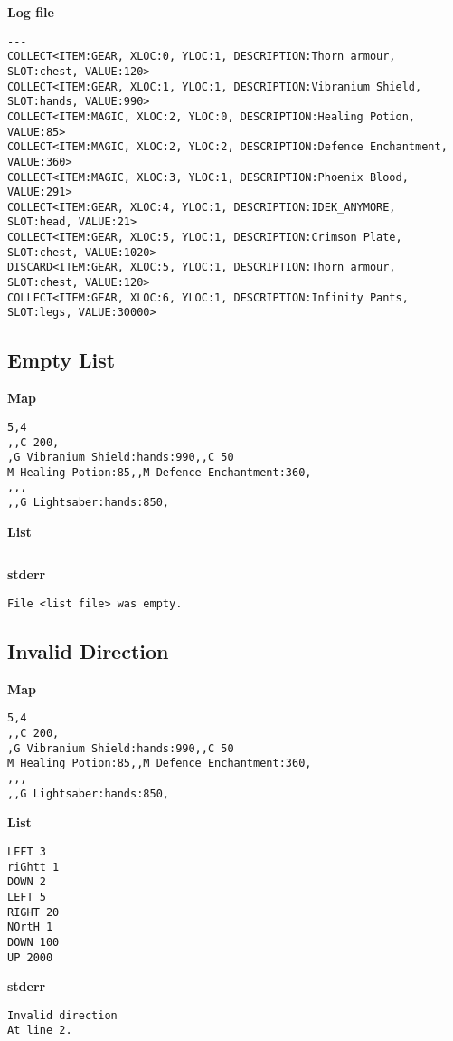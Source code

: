 \documentclass{article}
\begin{document}
\textbf{Log file}
\begin{lstlisting}
---
COLLECT<ITEM:GEAR, XLOC:0, YLOC:1, DESCRIPTION:Thorn armour, SLOT:chest, VALUE:120>
COLLECT<ITEM:GEAR, XLOC:1, YLOC:1, DESCRIPTION:Vibranium Shield, SLOT:hands, VALUE:990>
COLLECT<ITEM:MAGIC, XLOC:2, YLOC:0, DESCRIPTION:Healing Potion, VALUE:85>
COLLECT<ITEM:MAGIC, XLOC:2, YLOC:2, DESCRIPTION:Defence Enchantment, VALUE:360>
COLLECT<ITEM:MAGIC, XLOC:3, YLOC:1, DESCRIPTION:Phoenix Blood, VALUE:291>
COLLECT<ITEM:GEAR, XLOC:4, YLOC:1, DESCRIPTION:IDEK_ANYMORE, SLOT:head, VALUE:21>
COLLECT<ITEM:GEAR, XLOC:5, YLOC:1, DESCRIPTION:Crimson Plate, SLOT:chest, VALUE:1020>
DISCARD<ITEM:GEAR, XLOC:5, YLOC:1, DESCRIPTION:Thorn armour, SLOT:chest, VALUE:120>
COLLECT<ITEM:GEAR, XLOC:6, YLOC:1, DESCRIPTION:Infinity Pants, SLOT:legs, VALUE:30000>
\end{lstlisting}

\subsection{Empty List}
\quad \textbf{Map}
\begin{lstlisting}
5,4
,,C 200,
,G Vibranium Shield:hands:990,,C 50
M Healing Potion:85,,M Defence Enchantment:360,
,,,
,,G Lightsaber:hands:850,
\end{lstlisting}

\textbf{List}
\begin{lstlisting}

\end{lstlisting}
\pagebreak

\textbf{stderr}
\begin{lstlisting}
File <list file> was empty.
\end{lstlisting}

\subsection{Invalid Direction}
\quad \textbf{Map}
\begin{lstlisting}
5,4
,,C 200,
,G Vibranium Shield:hands:990,,C 50
M Healing Potion:85,,M Defence Enchantment:360,
,,,
,,G Lightsaber:hands:850,
\end{lstlisting}

\textbf{List}
\begin{lstlisting}
LEFT 3
riGhtt 1
DOWN 2
LEFT 5
RIGHT 20
NOrtH 1
DOWN 100
UP 2000
\end{lstlisting}
\pagebreak

\textbf{stderr}
\begin{lstlisting}
Invalid direction
At line 2.
\end{lstlisting}
\end{document}

